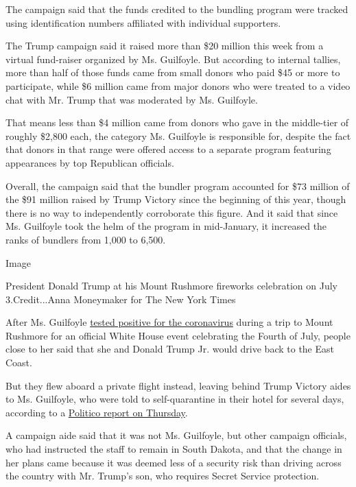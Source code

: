 The campaign said that the funds credited to the bundling program were
tracked using identification numbers affiliated with individual
supporters.

The Trump campaign said it raised more than \$20 million this week from
a virtual fund-raiser organized by Ms. Guilfoyle. But according to
internal tallies, more than half of those funds came from small donors
who paid \$45 or more to participate, while \$6 million came from major
donors who were treated to a video chat with Mr. Trump that was
moderated by Ms. Guilfoyle.

That means less than \$4 million came from donors who gave in the
middle-tier of roughly \$2,800 each, the category Ms. Guilfoyle is
responsible for, despite the fact that donors in that range were offered
access to a separate program featuring appearances by top Republican
officials.

Overall, the campaign said that the bundler program accounted for \$73
million of the \$91 million raised by Trump Victory since the beginning
of this year, though there is no way to independently corroborate this
figure. And it said that since Ms. Guilfoyle took the helm of the
program in mid-January, it increased the ranks of bundlers from 1,000 to
6,500.

Image

President Donald Trump at his Mount Rushmore fireworks celebration on
July 3.Credit...Anna Moneymaker for The New York Times

After Ms. Guilfoyle
\href{https://www.nytimes3xbfgragh.onion/2020/07/03/us/politics/kimberly-guilfoyle-trump-campaign-coronavirus.html}{tested
positive for the coronavirus} during a trip to Mount Rushmore for an
official White House event celebrating the Fourth of July, people close
to her said that she and Donald Trump Jr. would drive back to the East
Coast.

But they flew aboard a private flight instead, leaving behind Trump
Victory aides to Ms. Guilfoyle, who were told to self-quarantine in
their hotel for several days, according to a
\href{https://www.politico.com/news/2020/07/23/kimberly-guilfoyle-trump-fundraising-380380}{Politico
report on Thursday}.

A campaign aide said that it was not Ms. Guilfoyle, but other campaign
officials, who had instructed the staff to remain in South Dakota, and
that the change in her plans came because it was deemed less of a
security risk than driving across the country with Mr. Trump's son, who
requires Secret Service protection.

